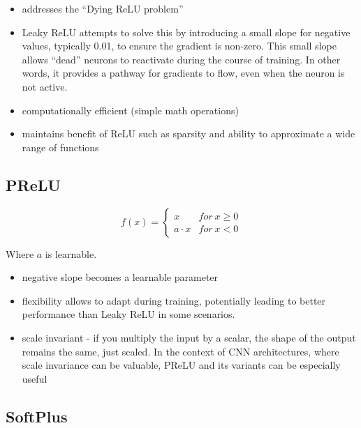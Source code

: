\documentclass[11pt]{article}
\begin{document}
\begin{itemize}
    \item addresses the ``Dying ReLU problem''
    \item Leaky ReLU attempts to solve this by introducing a small slope for negative values, typically 0.01, to ensure the gradient is non-zero. This small slope allows ``dead'' neurons to reactivate during the course of training. In other words, it provides a pathway for gradients to flow, even when the neuron is not active.
    \item computationally efficient (simple math operations)
    \item maintains benefit of ReLU such as sparsity and ability to approximate a wide range of functions
\end{itemize}

\subsection{PReLU}

\begin{definition}\label{eq:activation-prelu}
    \begin{equation*}
        f(x) = \begin{cases}
            x & for \ x \geq 0 \\ 
            a \cdot x & for \ x < 0
        \end{cases}
    \end{equation*}

    Where $a$ is learnable.
\end{definition}

\begin{itemize}
    \item negative slope becomes a learnable parameter
    \item flexibility allows to adapt during training, potentially leading to better performance than Leaky ReLU in some scenarios.
    \item scale invariant - if you multiply the input by a scalar, the shape of the output remains the same, just scaled. In the context of CNN architectures, where scale invariance can be valuable, PReLU and its variants can be especially useful
\end{itemize}

\subsection{SoftPlus}
\end{document}
